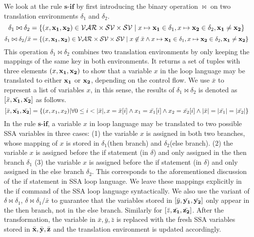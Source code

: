 We look at the rule $\textbf{s-if}$ by first introducing the binary operation $\bowtie$ on two translation environments $\delta_1$ and $\delta_2$. 
\[ \delta_1 \bowtie \delta_2 = \{ ( x, {{\bf{{x_1}}}, {\bf{{x_2}}}} ) \in \mathcal{VAR} \times \mathcal{SV} \times \mathcal{SV} \mid x \mapsto {{\bf{{x_1}}}} \in \delta_1 , x \mapsto {{\bf{{x_2}}} } \in \delta_2, {{\bf{{x_1}}} \not= {{\bf{{x_2}}} }  }  \} \]
\[ \delta_1 \bowtie \delta_2 / \bar{x} = \{ ( x, {{\bf{{x_1}}}, {\bf{{x_2}}}} ) \in \mathcal{VAR} \times \mathcal{SV} \times \mathcal{SV} \mid x \not\in \bar{x} \land x \mapsto {{\bf{{x_1}}}} \in \delta_1 , x \mapsto {{\bf{{x_2}}} } \in \delta_2, {{\bf{{x_1}}} \not= {{\bf{{x_2}}} }   }  \} \]
This operation $\delta_1 \bowtie \delta_2$ combines two translation environments by only keeping the mappings of the same key in both environments. It returns a set of tuples with three elements $(x,{\bf{{x_1}}}, {\bf{{x_2}}})$ to show that a variable $x$ in the {loop} language may be translated to either ${\bf{{x_1}}}$ or ${\bf{{x_2}}}$, depending on the control flow. We use $\bar{x}$ to represent a list of variables $x$, in this sense, the results of  $\delta_1 \bowtie \delta_2$ is denoted as $ [\bar{x}, \bar{{\bf{{x_1}}}}, \bar{{\bf{{x_2}}}}]$ as follows.
\[
 [\bar{x}, \bar{{\bf{{x_1}}}}, \bar{{\bf{{x_2}}}}] = \{ (x, x_1,x_2)  | \forall 0 \leq i < |\bar{x}|, x = \bar{x }[i] \land x_1 = \bar{x_1}[i] \land x_2 = \bar{x_2 }[i] \land |\bar{x}| = |\bar{x_1}| = |\bar{x_2}|   \}
\]
In the rule $\textbf{s-if}$, a variable $x$ in {loop} language may be translated to two possible SSA variables in three cases: (1) the variable $x$ is assigned in both two branches, whose mapping of $x$ is stored in $\delta_1$(then branch) and $\delta_2$(else branch). (2) the variable $x$ is assigned before the if statement (in $\delta$) and only assigned in the then branch $\delta_1$ (3) the variable $x$ is assigned before the if statement (in $\delta$) and only assigned in the else branch $\delta_2$. This corresponds to the aforementioned discussion of the if statement in SSA loop language. We leave these mappings explicitly in the if command of the SSA loop language syntactically. We also use the variant of $\delta \bowtie \delta_1$, $\delta \bowtie \delta_1 / \bar{x}$ to guarantee that the variables stored in $ [\bar{y}, \bar{{\bf{{y_1}}}}, \bar{{\bf{{y_2}}}}]$ only appear in the then branch, not in the else branch. Similarly for $ [\bar{z}, \bar{{\bf{{z_1}}}}, \bar{{\bf{{z_2}}}}]$. After the transformation, the variable in $\bar{x}, \bar{y}, \bar{z}$ is replaced with the fresh SSA variables stored in $\bar{{\bf{{x}}}},\bar{{\bf{{y}}}},\bar{{\bf{{z}}}}$ and the translation environment is updated accordingly.    


